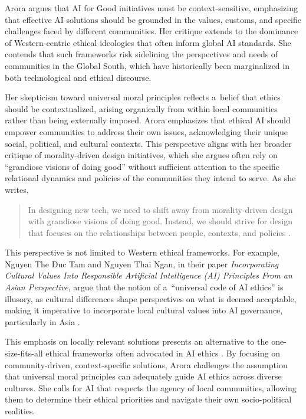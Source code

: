 \documentclass[%
  manuscript=article,
  year=2024,
  volume=77,
  doi=10.59203/zfn.77.707,
]{zfn}
\begin{document}
Arora argues that AI for Good initiatives must be context-sensitive, emphasizing that effective AI solutions should be grounded in the values, customs, and specific challenges faced by different communities. Her critique extends to the dominance of Western-centric ethical ideologies that often inform global AI standards. She contends that such frameworks risk sidelining the perspectives and needs of communities in the Global South, which have historically been marginalized in both technological and ethical discourse.



Her skepticism toward universal moral principles reflects a~belief that ethics should be contextualized, arising organically from within local communities rather than being externally imposed. Arora emphasizes that ethical AI should empower communities to address their own issues, acknowledging their unique social, political, and cultural contexts. This perspective aligns with her broader critique of morality-driven design initiatives, which she argues often rely on ``grandiose visions of doing good'' without sufficient attention to the specific relational dynamics and policies of the communities they intend to serve. As she writes,



\begin{quote}
In designing new tech, we need to shift away from morality-driven design with grandiose visions of doing good. Instead, we should strive for design that focuses on the relationships between people, contexts, and policies 
\parencite[][]{arora_pessimism_2024}.%
\end{quote}




This perspective is not limited to Western ethical frameworks. For example, Nguyen The Duc Tam and Nguyen Thai Ngan, in their paper \textit{Incorporating Cultural Values Into Responsible Artificial Intelligence (AI) Principles From an Asian Perspective}, argue that the notion of a~``universal code of AI ethics'' is illusory, as cultural differences shape perspectives on what is deemed acceptable, making it imperative to incorporate local cultural values into AI governance, particularly in Asia 
\parencite[][]{tam_incorporating_2023}.%




This emphasis on locally relevant solutions presents an alternative to the one-size-fits-all ethical frameworks often advocated in AI ethics 
\parencite[][]{world_economic_forum_ai_2024}. %
 By focusing on community-driven, context-specific solutions, Arora challenges the assumption that universal moral principles can adequately guide AI ethics across diverse cultures. She calls for AI that respects the agency of local communities, allowing them to determine their ethical priorities and navigate their own socio-political realities.
\end{document}
